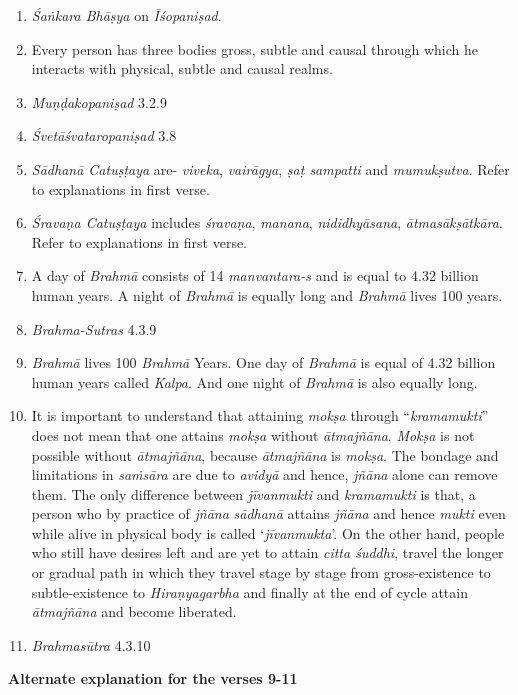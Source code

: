 \begin{enumerate}
\itemsep=1pt
\item
  \emph{Śaṅkara Bhāṣya} on \emph{Īśopaniṣad}.
\item
  Every person has three bodies gross, subtle and causal through which he interacts with physical, subtle and causal realms.
\item
  \emph{Muṇḍakopaniṣad} 3.2.9
\item
  \emph{Śvetāśvataropaniṣad} 3.8
\item
  \emph{Sādhanā Catuṣṭaya} are- \emph{viveka}, \emph{vairāgya}, \emph{ṣaṭ sampatti} and \emph{mumu\-kṣutva}. Refer to explanations in first verse.
\item
  \emph{Śravaṇa Catuṣṭaya} includes \emph{śravaṇa}, \emph{manana}, \emph{nididhyāsana}, \emph{ātma\-sākṣāt\-kāra}. Refer to explanations in first verse.
\item
  A day of \emph{Brahmā} consists of 14 \emph{manvantara-s} and is equal to 4.32 billion human years. A night of \emph{Brahmā} is equally long and \emph{Brahmā} lives 100 years.
\item
  \emph{Brahma-Sutras} 4.3.9
\item
  \emph{Brahmā} lives 100 \emph{Brahmā} Years. One day of \emph{Brahmā} is equal of 4.32 billion human years called \emph{Kalpa}. And one night of \emph{Brahmā} is also equally long.
\item
  It is important to understand that attaining \emph{mokṣa} through ``\emph{kramamukti}'' does not mean that one attains \emph{mokṣa} without \emph{ātmajñāna}. \emph{Mokṣa} is not possible without \emph{ātmajñāna}, because \emph{ātmajñāna} is \emph{mokṣa}. The bondage and limitations in \emph{saṁsāra} are due to \emph{avidyā} and hence, \emph{jñāna} alone can remove them. The only difference between \emph{jīvanmukti} and \emph{kramamukti} is that, a person who by practice of \emph{jñāna} \emph{sādhanā} attains \emph{jñāna} and hence \emph{mukti} even while alive in physical body is called `\emph{jīvanmukta}'. On the other hand, people who still have desires left and are yet to attain \emph{citta śuddhi}, travel the longer or gradual path in which they travel stage by stage from gross-existence to subtle-existence to \emph{Hiraṇyagarbha} and finally at the end of cycle attain \emph{ātmajñāna} and become liberated.
\item
  \emph{Brahmasūtra} 4.3.10
\end{enumerate}

\textbf{Alternate explanation for the verses 9-11}

